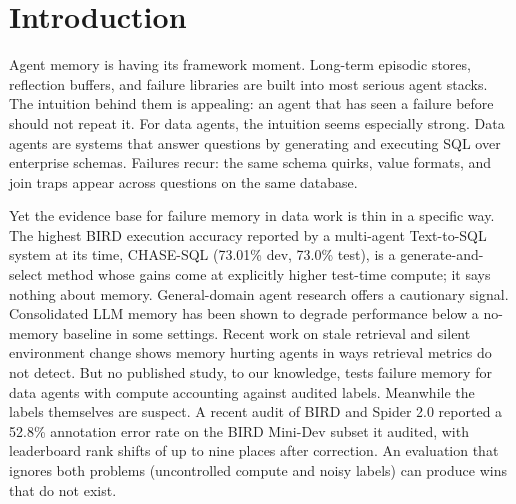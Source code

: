 \documentclass[sigconf, nonacm]{acmart}
\begin{document}
\begin{abstract}
accounting jointly producing an apparent win, though the corrected subset (49 tasks, $\pm$8 points) cannot by itself exclude a real effect. Under a strictly enforced cap in the replication, the same arm is null on original labels as well. A post-hoc verifier ablation (Amendment A14, extended by the A15 store transplant) adds a further caution: the base agent's self-verifier is a net harm ($-8.5$ to $-9.8$ points), and the memory null persists without it, including when the verifier-off agent is given a full-size transplanted memory store (\S5.6). We release the evaluation design, the drift split construction, and a strict no-gold memory-acquisition methodology (56.5\% acquisition rate) as reusable artifacts. Our conclusion is narrow and, we argue, useful. On this substrate, under attempt-matched comparison, episodic failure memory of the form we test is not where the gains are. Evaluations that do not control labels and tokens cannot be trusted to say where they are.
\end{abstract}

\maketitle

\vldbtopmatter

\section{Introduction}

Agent memory is having its framework moment. Long-term episodic stores, reflection buffers, and failure libraries are built into most serious agent stacks. The intuition behind them is appealing: an agent that has seen a failure before should not repeat it. For data agents, the intuition seems especially strong. Data agents are systems that answer questions by generating and executing SQL over enterprise schemas. Failures recur: the same schema quirks, value formats, and join traps appear across questions on the same database.

Yet the evidence base for failure memory in data work is thin in a specific way. The highest BIRD execution accuracy reported by a multi-agent Text-to-SQL system at its time, CHASE-SQL (73.01\% dev, 73.0\% test), is a generate-and-select method whose gains come at explicitly higher test-time compute; it says nothing about memory. General-domain agent research offers a cautionary signal. Consolidated LLM memory has been shown to degrade performance below a no-memory baseline in some settings. Recent work on stale retrieval and silent environment change shows memory hurting agents in ways retrieval metrics do not detect. But no published study, to our knowledge, tests failure memory for data agents with compute accounting against audited labels. Meanwhile the labels themselves are suspect. A recent audit of BIRD and Spider 2.0 reported a 52.8\% annotation error rate on the BIRD Mini-Dev subset it audited, with leaderboard rank shifts of up to nine places after correction. An evaluation that ignores both problems (uncontrolled compute and noisy labels) can produce wins that do not exist.
\end{document}
